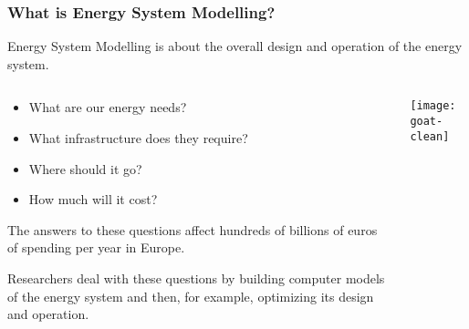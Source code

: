 \documentclass[10pt,aspectratio=169,dvipsnames]{beamer}
\let\olditem\item
\renewcommand{\item}{%
\olditem\vspace{5pt}}
\begin{document}
\begin{frame}
  \frametitle{What is Energy System Modelling?}

  \alert{Energy System Modelling} is about the overall \alert{design} and \alert{operation} of the energy system.


\begin{columns}[T]
  \begin{column}{8cm}

    \vspace{.1cm}
    \begin{itemize}
      \item What are our \alert{energy needs}?
  \item What \alert{infrastructure} does they
    require?
  \item \alert{Where} should it go?
  \item How much will it \alert{cost}?
  \end{itemize}

  \hspace{0.2cm}

  The answers to these questions affect \alert{hundreds of billions}
  of euros of spending per year in Europe.

  \hspace{0.3cm}

  Researchers deal with these questions by \alert{building computer models}
  of the energy system and then, for example, \alert{optimizing}
  its design and operation.

  \end{column}
  \begin{column}{5.5cm}
    \vspace{.2cm}
  \texttt{[image: goat-clean]}
  \end{column}
\end{columns}
\end{frame}
\end{document}
